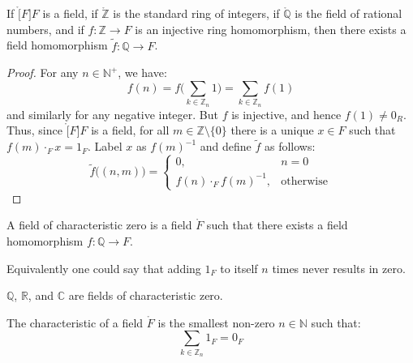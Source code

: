 \documentclass{article}                                                        %
\begin{document}
        \begin{theorem}
            If $\ring[F]{F}$ is a field, if $\ring{\mathbb{Z}}$ is the standard
            ring of integers, if $\ring{\mathbb{Q}}$ is the field of
            rational numbers, and if $f:\mathbb{Z}\rightarrow{F}$ is an
            injective ring homomorphism, then there exists a field homomorphism
            $\tilde{f}:\mathbb{Q}\rightarrow{F}$.
        \end{theorem}
        \begin{proof}
            For any $n\in\mathbb{N}^{+}$, we have:
            \begin{equation}
                f(n)=f\Big(\sum_{k\in\mathbb{Z}_{n}}1\Big)
                =\sum_{k\in\mathbb{Z}_{n}}f(1)
            \end{equation}
            and similarly for any negative integer. But $f$ is injective, and
            hence $f(1)\ne{0}_{R}$. Thus, since $\ring[F]{F}$ is a field, for
            all $m\in\mathbb{Z}\setminus\{0\}$ there is a unique $x\in{F}$ such
            that $f(m)\cdot_{F}x=1_{F}$. Label $x$ as $f(m)^{\minus{1}}$ and
            define $\tilde{f}$ as follows:
            \begin{equation}
                \tilde{f}\big((n,m)\big)=
                \begin{cases}
                    0,&n=0\\
                    f(n)\cdot_{F}f(m)^{\minus{1}},&\textrm{otherwise}
                \end{cases}
            \end{equation}
        \end{proof}
        \begin{definition}
            A field of characteristic zero is a field $\ring{F}$ such that there
            exists a field homomorphism $f:\mathbb{Q}\rightarrow{F}$.
        \end{definition}
        Equivalently one could say that adding $1_{F}$ to itself $n$ times never
        results in zero.
        \begin{example}
            $\mathbb{Q}$, $\mathbb{R}$, and $\mathbb{C}$ are fields of
            characteristic zero.
        \end{example}
        \begin{definition}
            The characteristic of a field $\ring{F}$ is the smallest non-zero
            $n\in\mathbb{N}$ such that:
            \begin{equation}
                \sum_{k\in\mathbb{Z}_{n}}1_{F}=0_{F}
            \end{equation}
        \end{definition}
\end{document}

